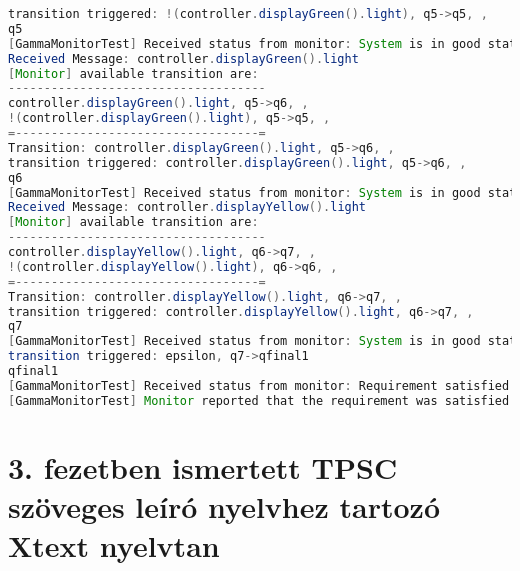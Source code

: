 \begin{lstlisting}[language=java, caption={\textit{Gamma} monitor kimenet rendőrségi példa.},captionpos=b,label=gamma_monitor_output2]
transition triggered: !(controller.displayGreen().light), q5->q5, ,
q5
[GammaMonitorTest] Received status from monitor: System is in good state.
Received Message: controller.displayGreen().light
[Monitor] available transition are:
------------------------------------
controller.displayGreen().light, q5->q6, ,
!(controller.displayGreen().light), q5->q5, ,
=----------------------------------=
Transition: controller.displayGreen().light, q5->q6, ,
transition triggered: controller.displayGreen().light, q5->q6, ,
q6
[GammaMonitorTest] Received status from monitor: System is in good state.
Received Message: controller.displayYellow().light
[Monitor] available transition are:
------------------------------------
controller.displayYellow().light, q6->q7, ,
!(controller.displayYellow().light), q6->q6, ,
=----------------------------------=
Transition: controller.displayYellow().light, q6->q7, ,
transition triggered: controller.displayYellow().light, q6->q7, ,
q7
[GammaMonitorTest] Received status from monitor: System is in good state.
transition triggered: epsilon, q7->qfinal1
qfinal1
[GammaMonitorTest] Received status from monitor: Requirement satisfied
[GammaMonitorTest] Monitor reported that the requirement was satisfied
\end{lstlisting}

\clearpage\section{3. fezetben ismertett TPSC szöveges leíró nyelvhez tartozó Xtext nyelvtan}


